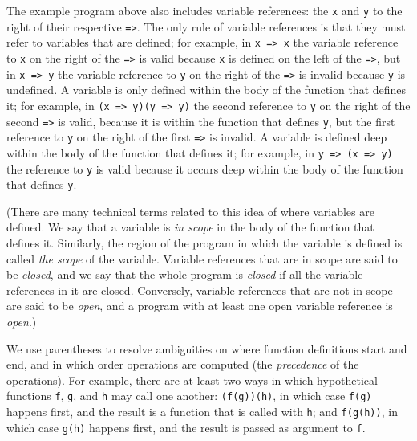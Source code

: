 \documentclass[12pt, oneside]{book}
\begin{document}
The example program above also includes variable references: the \texttt{x} and \texttt{y} to the right of their respective \texttt{=>}. The only rule of variable references is that they must refer to variables that are defined; for example, in \texttt{x => x} the variable reference to \texttt{x} on the right of the \texttt{=>} is valid because \texttt{x} is defined on the left of the \texttt{=>}, but in \texttt{x => y} the variable reference to \texttt{y} on the right of the \texttt{=>} is invalid because \texttt{y} is undefined. A variable is only defined within the body of the function that defines it; for example, in \texttt{(x => y)(y => y)} the second reference to \texttt{y} on the right of the second \texttt{=>} is valid, because it is within the function that defines \texttt{y}, but the first reference to \texttt{y} on the right of the first \texttt{=>} is invalid. A variable is defined deep within the body of the function that defines it; for example, in \texttt{y => (x => y)} the reference to \texttt{y} is valid because it occurs deep within the body of the function that defines \texttt{y}.

(There are many technical terms related to this idea of where variables are defined. We say that a variable is \emph{in scope} in the body of the function that defines it. Similarly, the region of the program in which the variable is defined is called \emph{the scope} of the variable. Variable references that are in scope are said to be \emph{closed}, and we say that the whole program is \emph{closed} if all the variable references in it are closed. Conversely, variable references that are not in scope are said to be \emph{open}, and a program with at least one open variable reference is \emph{open}.)

We use parentheses to resolve ambiguities on where function definitions start and end, and in which order operations are computed (the \emph{precedence} of the operations). For example, there are at least two ways in which hypothetical functions \texttt{f}, \texttt{g}, and \texttt{h} may call one another: \texttt{(f(g))(h)}, in which case \texttt{f(g)} happens first, and the result is a function that is called with \texttt{h}; and \texttt{f(g(h))}, in which case \texttt{g(h)} happens first, and the result is passed as argument to \texttt{f}.
\end{document}
